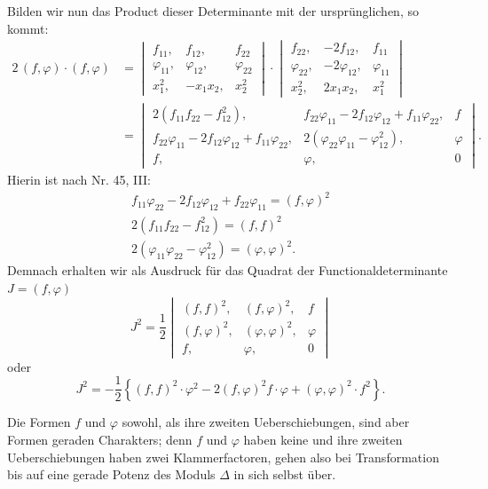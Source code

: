 \documentclass[11pt]{article}
\providecommand{\weberpage}[1]{}
\providecommand{\weq}[2]{\begin{equation}\tag{#1}#2\end{equation}}
\let\Delta\varDelta
\begin{document}
\weberpage{52}
Bilden wir nun das Product dieser Determinante mit der ursprünglichen, so kommt:
\[
\begin{aligned}
2\,(f, \varphi)\cdot(f, \varphi) &= \begin{vmatrix} f_{11}, & f_{12}, & f_{22} \\ \varphi_{11}, & \varphi_{12}, & \varphi_{22} \\ x_1^2, & -x_1x_2, & x_2^2 \end{vmatrix} \cdot \begin{vmatrix} f_{22}, & -2f_{12}, & f_{11} \\ \varphi_{22}, & -2\varphi_{12}, & \varphi_{11} \\ x_2^2, & 2x_1x_2, & x_1^2 \end{vmatrix} \\
&= \begin{vmatrix} 2(f_{11}f_{22} - f_{12}^2), & f_{22}\varphi_{11} - 2f_{12}\varphi_{12} + f_{11}\varphi_{22}, & f \\ f_{22}\varphi_{11} - 2f_{12}\varphi_{12} + f_{11}\varphi_{22}, & 2(\varphi_{22}\varphi_{11} - \varphi_{12}^2), & \varphi \\ f, & \varphi, & 0 \end{vmatrix}.
\end{aligned}
\]
Hierin ist nach Nr. 45, III:
\[
\begin{array}{l}
f_{11}\varphi_{22} - 2f_{12}\varphi_{12} + f_{22}\varphi_{11} = (f, \varphi)^2 \\
2(f_{11}f_{22} - f_{12}^2) = (f, f)^2 \\
2(\varphi_{11}\varphi_{22} - \varphi_{12}^2) = (\varphi, \varphi)^2.
\end{array}
\]
Demnach erhalten wir als Ausdruck für das Quadrat der Functionaldeterminante $J = (f, \varphi)$
\[
J^2 = \frac{1}{2} \begin{vmatrix} (f, f)^2, & (f, \varphi)^2, & f \\ (f, \varphi)^2, & (\varphi, \varphi)^2, & \varphi \\ f, & \varphi, & 0 \end{vmatrix}
\]
oder
\weq{I}{J^2 = -\frac{1}{2}\left\{(f, f)^2\cdot\varphi^2 - 2(f, \varphi)^2 f\cdot\varphi + (\varphi, \varphi)^2\cdot f^2\right\}.}

Die Formen $f$ und $\varphi$ sowohl, als ihre zweiten Ueberschiebungen, sind aber Formen geraden Charakters; denn $f$ und $\varphi$ haben keine und ihre zweiten Ueberschiebungen haben zwei Klammerfactoren, gehen also bei Transformation bis auf eine gerade Potenz des Moduls $\Delta$ in sich selbst über.
\end{document}
